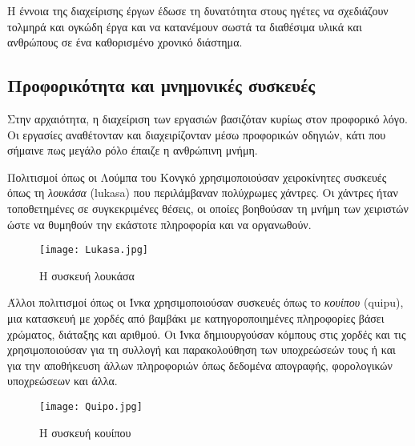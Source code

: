         Η έννοια της διαχείρισης έργων έδωσε τη δυνατότητα στους ηγέτες να σχεδιάζουν τολμηρά και ογκώδη έργα και να κατανέμουν σωστά τα διαθέσιμα υλικά και ανθρώπους σε ένα καθορισμένο χρονικό διάστημα.

        \subsection{Προφορικότητα και μνημονικές συσκευές}
            Στην αρχαιότητα, η διαχείριση των εργασιών βασιζόταν κυρίως στον προφορικό λόγο. Οι εργασίες αναθέτονταν και διαχειρίζονταν μέσω προφορικών οδηγιών, κάτι που σήμαινε πως μεγάλο ρόλο έπαιζε η ανθρώπινη μνήμη. \cite{Goody2013}


            Πολιτισμοί όπως οι Λούμπα του Κονγκό χρησιμοποιούσαν χειροκίνητες συσκευές όπως τη \textit{λουκάσα} (lukasa) που περιλάμβαναν πολύχρωμες χάντρες. Οι χάντρες ήταν τοποθετημένες σε συγκεκριμένες θέσεις, οι οποίες βοηθούσαν τη μνήμη των χειριστών ώστε να θυμηθούν την εκάστοτε πληροφορία και να οργανωθούν. \cite{Lukasa}

            \begin{figure}[H] \noindent \centering
                \texttt{[image: Lukasa.jpg]}
                \caption{Η συσκευή λουκάσα}
            \end{figure}

            Άλλοι πολιτισμοί όπως οι Ίνκα χρησιμοποιούσαν συσκευές όπως το \textit{κουίπου} \linebreak (quipu), μια κατασκευή με χορδές από βαμβάκι με κατηγοροποιημένες πληροφορίες βάσει χρώματος, διάταξης και αριθμού. Οι Ίνκα δημιουργούσαν κόμπους στις χορδές και τις χρησιμοποιούσαν για τη συλλογή και παρακολούθηση των υποχρεώσεών τους ή και για την αποθήκευση άλλων πληροφοριών όπως δεδομένα απογραφής, φορολογικών υποχρεώσεων και άλλα. \cite{Quipu}

            \begin{figure}[H] \noindent \centering
                \texttt{[image: Quipo.jpg]}
                \caption{Η συσκευή κουίπου}
            \end{figure}


